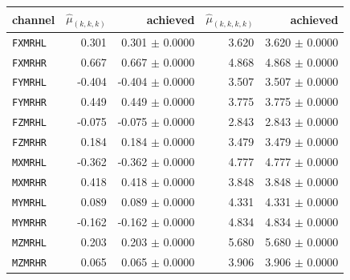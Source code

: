\begin{tabular}{l r r r r}
channel & $\hat\mu_{(k,k,k)}$ & achieved & $\hat\mu_{(k,k,k,k)}$ & achieved \\
\hline
\texttt{FXMRHL} & 0.301 & 0.301 $\pm$ 0.0000 & 3.620 & 3.620 $\pm$ 0.0000 \\
\texttt{FXMRHR} & 0.667 & 0.667 $\pm$ 0.0000 & 4.868 & 4.868 $\pm$ 0.0000 \\
\texttt{FYMRHL} & -0.404 & -0.404 $\pm$ 0.0000 & 3.507 & 3.507 $\pm$ 0.0000 \\
\texttt{FYMRHR} & 0.449 & 0.449 $\pm$ 0.0000 & 3.775 & 3.775 $\pm$ 0.0000 \\
\texttt{FZMRHL} & -0.075 & -0.075 $\pm$ 0.0000 & 2.843 & 2.843 $\pm$ 0.0000 \\
\texttt{FZMRHR} & 0.184 & 0.184 $\pm$ 0.0000 & 3.479 & 3.479 $\pm$ 0.0000 \\
\texttt{MXMRHL} & -0.362 & -0.362 $\pm$ 0.0000 & 4.777 & 4.777 $\pm$ 0.0000 \\
\texttt{MXMRHR} & 0.418 & 0.418 $\pm$ 0.0000 & 3.848 & 3.848 $\pm$ 0.0000 \\
\texttt{MYMRHL} & 0.089 & 0.089 $\pm$ 0.0000 & 4.331 & 4.331 $\pm$ 0.0000 \\
\texttt{MYMRHR} & -0.162 & -0.162 $\pm$ 0.0000 & 4.834 & 4.834 $\pm$ 0.0000 \\
\texttt{MZMRHL} & 0.203 & 0.203 $\pm$ 0.0000 & 5.680 & 5.680 $\pm$ 0.0000 \\
\texttt{MZMRHR} & 0.065 & 0.065 $\pm$ 0.0000 & 3.906 & 3.906 $\pm$ 0.0000 \\
\end{tabular}
